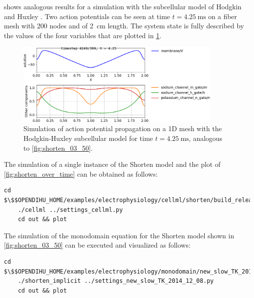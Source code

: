  shows analogous results for a simulation with the subcellular model of Hodgkin and Huxley \cite{Hodgkin1952}. Two action potentials can be seen  at time $t=\SI{4.25}{\ms}$ on a fiber mesh with 200 nodes and of \SI{2}{\cm} length. The system state is fully described by the values of the four variables that are plotted in \cref{fig:hodgkin_huxley_over_mesh}.

\begin{figure}
  \centering%
  \includegraphics[width=0.9\textwidth]{images/results/basic/hodgkin_huxley_over_mesh.png}%
  \caption{Simulation of action potential propagation on a 1D mesh with the Hodgkin-Huxley subcellular model for time $t=\SI{4.25}{\ms}$, analogous to \cref{fig:shorten_03_50}.}%
  \label{fig:hodgkin_huxley_over_mesh}%
\end{figure}%

\begin{reproduce_no_break}
  The simulation of a single instance of the Shorten model and the plot of \cref{fig:shorten_over_time} can be obtained as follows:
  \begin{lstlisting}[columns=fullflexible,breaklines=true,postbreak=\mbox{\textcolor{gray}{$\hookrightarrow$}\space}]
    cd $\$$OPENDIHU_HOME/examples/electrophysiology/cellml/shorten/build_release
    ./cellml ../settings_cellml.py
    cd out && plot
  \end{lstlisting}
  The simulation of the monodomain equation for the Shorten model shown in \cref{fig:shorten_03_50} can be executed and visualized as follows: 
  \begin{lstlisting}[columns=fullflexible,breaklines=true,postbreak=\mbox{\textcolor{gray}{$\hookrightarrow$}\space}]
    cd $\$$OPENDIHU_HOME/examples/electrophysiology/monodomain/new_slow_TK_2014_12_08/build_release
    ./shorten_implicit ../settings_new_slow_TK_2014_12_08.py
    cd out && plot
  \end{lstlisting}
\end{reproduce_no_break}

